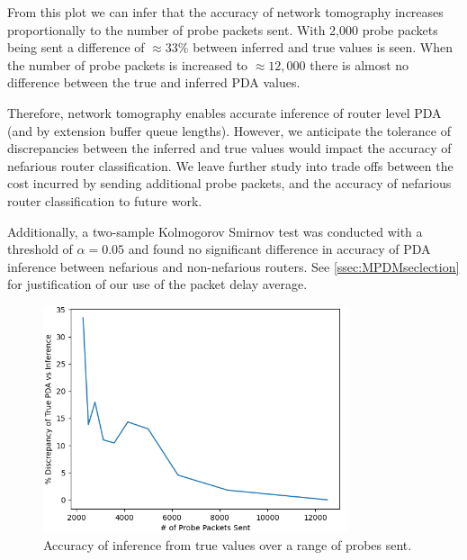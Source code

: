 From this plot we can infer that the accuracy of network tomography increases proportionally to the number of probe packets sent. With 2,000 probe packets being sent a difference of $\approx 33\%$ between inferred and true values is seen. When the number of probe packets is increased to $\approx 12,000$ there is almost no difference between the true and inferred PDA values.\par
Therefore, network tomography enables accurate inference of router level PDA (and by extension buffer queue lengths). However, we anticipate the tolerance of discrepancies between the inferred and true values would impact the accuracy of nefarious router classification. We leave further study into trade offs between the cost incurred by sending additional probe packets, and the accuracy of nefarious router classification to future work.\par
Additionally, a two-sample Kolmogorov Smirnov test was conducted with a threshold of $\alpha=0.05$ and found no significant difference in accuracy of PDA inference between nefarious and non-nefarious routers. See \cref{ssec:MPDMseclection} for justification of our use of the packet delay average.
\begin{figure}[H]
    \centering
    \includegraphics[width=0.8\textwidth]{figs/results/Probe_PDV_accuracy_plot.png}
    \caption{Accuracy of inference from true values over a range of probes sent.}
    \label{fig:MPDAvarprobing}
\end{figure}

